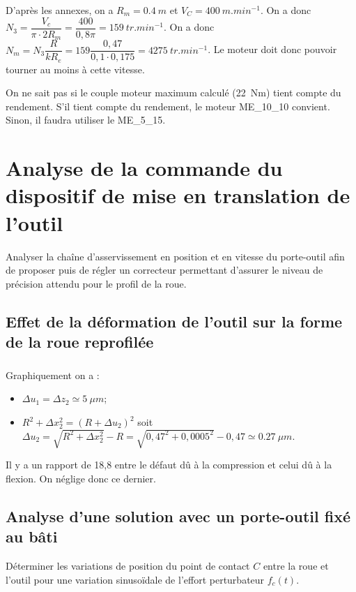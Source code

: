 \documentclass[10pt,fleqn]{article} %
\begin{document}
D'après les annexes, on a $R_m=\SI{0,4}{m}$ et $V_C=\SI{400}{m.min^{-1}}$. On a donc $N_3=\dfrac{V_c}{\pi \cdot 2 R_m} = \dfrac{400}{0,8\pi} = \SI{159}{tr.min^{-1}}$. On a donc $N_m = N_3 \dfrac{R}{kR_e}=159 \dfrac{0,47}{0,1\cdot 0,175} = \SI{4275}{tr.min^{-1}}$. Le moteur doit donc pouvoir tourner au moins à cette vitesse.

On ne sait pas si le couple moteur maximum calculé (\SI{22}{Nm}) tient compte du rendement. 
S'il tient compte du rendement, le moteur ME\_10\_10 convient. Sinon, il faudra utiliser le ME\_5\_15. 

\section{Analyse de la commande du dispositif de mise en translation de l’outil}
\begin{obj}
Analyser la chaîne d’asservissement en position et en vitesse du porte-outil afin de proposer puis de régler un correcteur permettant d’assurer le niveau de précision attendu pour le profil de la roue.
\end{obj}

\subsection{Effet de la déformation de l’outil sur la forme de la roue reprofilée}

\subparagraph{} %

Graphiquement on a :
\begin{itemize}
\item $\Delta u_1 = \Delta z_2 \simeq \SI{5}{\mu m}$;
\item $R^2 + \Delta x_2^2 = \left(R + \Delta u_2\right)^2$ soit $\Delta u_2 = \sqrt{R^2 + \Delta x_2^2} - R = \sqrt{0,47^2 + 0,0005^2} - 0,47 \simeq \SI{0,27}{\mu m}$.%
\end{itemize}
Il y a un rapport de 18,8 entre le défaut dû à la compression et celui dû à la flexion. On néglige donc ce dernier. 
 

\subsection{Analyse d’une solution avec un porte-outil fixé au bâti}
\begin{obj}
Déterminer les variations de position du point de contact $C$ entre la roue et l’outil pour une variation
sinusoïdale de l’effort perturbateur $f_c(t)$.
\end{obj}
\end{document}
